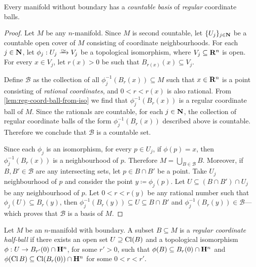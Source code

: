 \begin{proposition}
    \label{prop:man-countable-basis-reg-balls}
    Every manifold without boundary has a \emph{countable basis} of \emph{regular}
    coordinate balls.
\end{proposition}

\begin{proof}
    Let \(M\) be any \(n\)-manifold. Since \(M\) is second countable, let
    \(\{U_{j}\}_{j \in \mathbf{N}}\) be a countable open cover of \(M\) consisting of
    coordinate neighbourhoods. For each \(j \in \mathbf{N}\), let \(\phi_j: U_j \isoto V_j\)
    be a topological isomorphism, where \(V_j \subseteq \mathbf{R}^n\) is open. For every
    \(x \in V_j\), let \(r(x) > 0\) be such that \(B_{r(x)}(x) \subseteq V_j\).

    Define \(\mathcal{B}\) as the collection of all \(\phi_j^{-1}(B_{r}(x))
    \subseteq M\) such that \(x \in \mathbf{R}^n\) is a point consisting of \emph{rational
        coordinates}, and \(0 < r < r(x)\) is also rational. From
    \cref{lem:reg-coord-ball-from-iso} we find that \(\phi_j^{-1}(B_r(x))\) is a
    regular coordinate ball of \(M\). Since the rationals are countable, for each
    \(j \in \mathbf{N}\), the collection of regular coordinate balls of the form
    \(\phi_j^{-1}(B_r(x))\) described above is countable. Therefore we conclude that
    \(\mathcal{B}\) is a countable set.

    Since each \(\phi_j\) is an isomorphism, for every \(p \in U_j\), if
    \(\phi(p) = x\), then \(\phi_j^{-1}(B_r(x))\) is a neighbourhood of
    \(p\). Therefore \(M = \bigcup_{B \in \mathcal{B}} B\). Moreover, if
    \(B, B' \in \mathcal{B}\) are any intersecting sets, let \(p \in B \cap B'\) be
    a point. Take \(U_j\) neighbourhood of \(p\) and consider the point
    \(y \coloneq \phi_j(p)\). Let \(U \subseteq (B \cap B') \cap U_j\) be any
    neighbourhood of \(p\). Let \(0 < r < r(y)\) be any rational number such that
    \(\phi_j(U) \subseteq B_r(y)\), then
    \(\phi_j^{-1}(B_r(y)) \subseteq U \subseteq B \cap B'\) and
    \(\phi_j^{-1}(B_r(y)) \in \mathcal{B}\)---which proves that \(\mathcal{B}\) is
    a basis of \(M\).
\end{proof}

\begin{definition}
    \label{def:reg-coord-half-ball}
    Let \(M\) be an \(n\)-manifold with boundary. A subset \(B \subseteq M\) is a
    \emph{regular coordinate half-ball} if there exists an open set
    \(U \supseteq \operatorname{Cl}(B)\) and a topological isomorphism
    \(\phi: U \to B_{r'}(0) \cap \mathbf{H}^n\), for some \(r' > 0\), such that
    \(\phi(B) \subseteq B_r(0) \cap \mathbf{H}^n\) and
    \(\phi(\operatorname{Cl} B) \subseteq \operatorname{Cl}(B_r(0)) \cap \mathbf{H}^n\) for some \(0 < r < r'\).
\end{definition}

